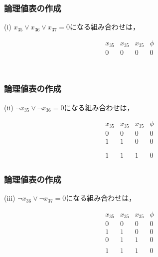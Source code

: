 \begin{frame}

\frametitle{論理値表の作成}

(i) $x_{35}\lor x_{36}\lor x_{37}=0$になる組み合わせは，

\[
\begin{array}{c|c|c|c}
x_{35} & x_{35} & x_{35} & \phi \\
\hline
0 & 0 & 0 & 0 \\
 &  &  &  \\
 &  &  &  \\
 &  &  &  \\
 &  &  &  \\
\end{array}
\]

\end{frame}

\begin{frame}

\frametitle{論理値表の作成}

(ii) $\lnot x_{35}\lor\lnot x_{36}=0$になる組み合わせは，

\[
\begin{array}{c|c|c|c}
x_{35} & x_{35} & x_{35} & \phi \\
\hline
0 & 0 & 0 & 0 \\
1 & 1 & 0 & 0 \\
 &  &  &  \\
 &  &  &  \\
1 & 1 & 1 & 0 \\
\end{array}
\]

\end{frame}

\begin{frame}

\frametitle{論理値表の作成}

(iii) $\lnot x_{36}\lor\lnot x_{37}=0$になる組み合わせは，

\[
\begin{array}{c|c|c|c}
x_{35} & x_{35} & x_{35} & \phi \\
\hline
0 & 0 & 0 & 0 \\
1 & 1 & 0 & 0 \\
0 & 1 & 1 & 0 \\
 &  &  &  \\
1 & 1 & 1 & 0 \\
\end{array}
\]

\end{frame}

